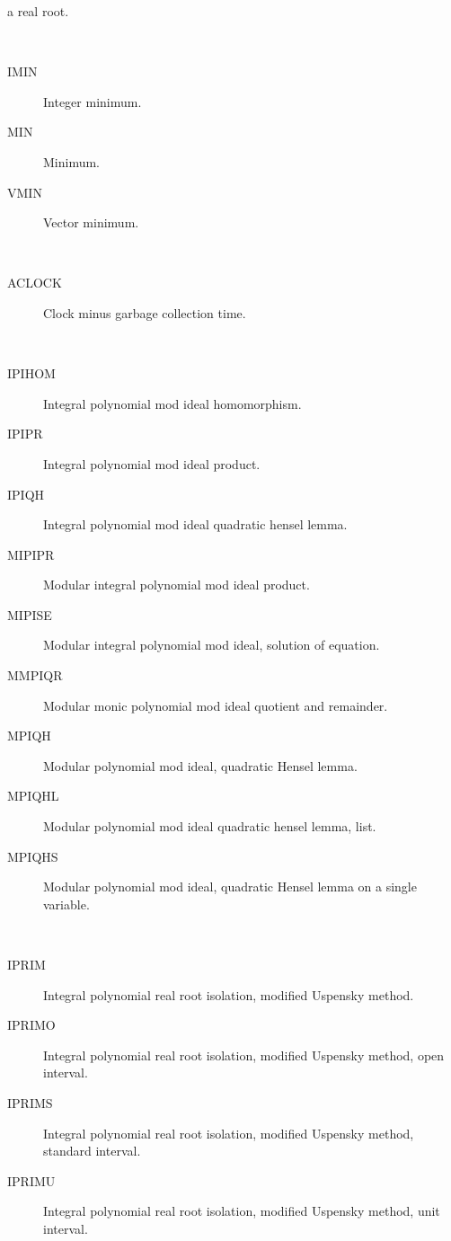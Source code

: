 \begin{description}
\begin{description}
    a real root.
  \end{description}
\item[minimum] \ \ 
  \begin{description}
  \item[IMIN]  Integer minimum.
  \item[MIN]  Minimum.
  \item[VMIN]  Vector minimum.
  \end{description}
\item[minus] \ \ 
  \begin{description}
  \item[ACLOCK]  Clock minus garbage collection time.
  \end{description}
\item[mod] \ \ 
  \begin{description}
  \item[IPIHOM]  Integral polynomial mod ideal homomorphism.
  \item[IPIPR]  Integral polynomial mod ideal product.
  \item[IPIQH]  Integral polynomial mod ideal quadratic hensel lemma.
  \item[MIPIPR]  Modular integral polynomial mod ideal product.
  \item[MIPISE]  Modular integral polynomial mod ideal, solution of equation.
  \item[MMPIQR]  Modular monic polynomial mod ideal quotient and remainder.
  \item[MPIQH]  Modular polynomial mod ideal, quadratic Hensel lemma.
  \item[MPIQHL]  Modular polynomial mod ideal quadratic hensel lemma, list.
  \item[MPIQHS]  Modular polynomial mod ideal, quadratic Hensel lemma on a
    single variable.
  \end{description}
\item[modified] \ \ 
  \begin{description}
  \item[IPRIM]  Integral polynomial real root isolation, modified Uspensky
    method.
  \item[IPRIMO]  Integral polynomial real root isolation, modified Uspensky
    method, open interval.
  \item[IPRIMS]  Integral polynomial real root isolation, modified Uspensky
    method, standard interval.
  \item[IPRIMU]  Integral polynomial real root isolation, modified Uspensky
    method, unit interval.

\end{description}
\end{description}
